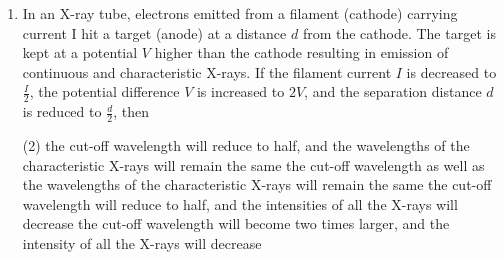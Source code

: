 
\begin{enumerate}
    \item In an X-ray tube, electrons emitted from a filament (cathode) carrying current I hit a target (anode) at a distance \(d\) from the cathode. The target is kept at a potential \(V\) higher than the cathode resulting in emission of continuous and characteristic X-rays. If the filament current \(I\) is decreased to \(\frac{I}{2}\), the potential difference \(V\) is increased to \(2V\), and the separation distance \(d\) is reduced to \(\frac{d}{2}\), then
        \begin{tasks}(2)
            \task the cut-off wavelength will reduce to half, and the wavelengths of the characteristic X-rays will remain the same
            \task the cut-off wavelength as well as the wavelengths of the characteristic X-rays will remain the same
            \task the cut-off wavelength will reduce to half, and the intensities of all the X-rays will decrease
            \task the cut-off wavelength will become two times larger, and the intensity of all the X-rays will decrease
        \end{tasks}
\end{enumerate}
